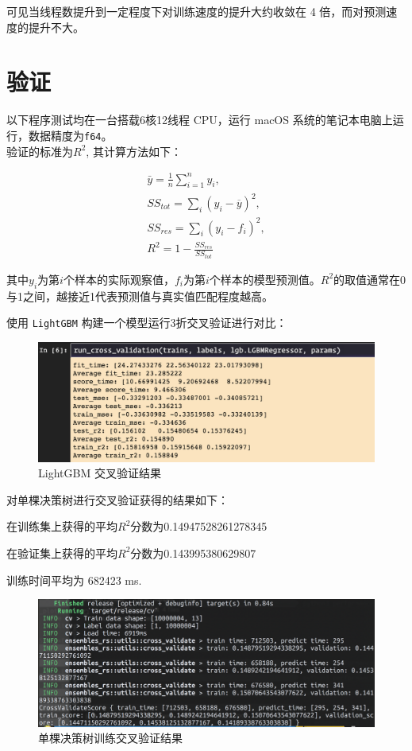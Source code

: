 \documentclass[12pt]{article}
\begin{document}
可见当线程数提升到一定程度下对训练速度的提升大约收敛在 4 倍，而对预测速度的提升不大。

\section{验证}
以下程序测试均在一台搭载6核12线程 CPU，运行 macOS 系统的笔记本电脑上运行，数据精度为\lstinline{f64}。
\\

验证的标准为$R^2$, 其计算方法如下：

\begin{equation}
    \begin{aligned}
    \bar{y}= \frac{1}{n}\sum_{i=1}^n y_i,\\
    SS_{tot} = \sum_i(y_i-\overline{y})^2,\\
    SS_{res} = \sum_i(y_i-f_i)^2,\\
    R^2 = 1 - \frac{SS_{res}}{SS_{tot}}
    \end{aligned}
\end{equation}

其中$y_i$为第$i$个样本的实际观察值，$f_i$为第$i$个样本的模型预测值。$R^2$的取值通常在0与1之间，越接近1代表预测值与真实值匹配程度越高。


使用 \lstinline{LightGBM} \cite{NIPS2017_6907} 构建一个模型运行3折交叉验证进行对比：

\begin{figure}[H]
    \centering
    \includegraphics[scale=0.6]{lgb-baseline.png}
    \caption{LightGBM 交叉验证结果}
    \label{}
\end{figure}

对单棵决策树进行交叉验证获得的结果如下：

在训练集上获得的平均$R^2$分数为0.14947528261278345

在验证集上获得的平均$R^2$分数为0.143995380629807

训练时间平均为 682423 ms.

\begin{figure}[H]
    \centering
    \includegraphics[scale=0.6]{single-tree-cv.png}
    \caption{单棵决策树训练交叉验证结果}
    \label{}
\end{figure}
\end{document}
